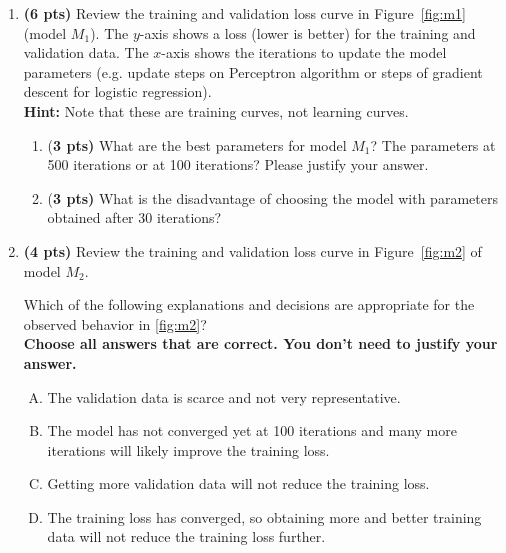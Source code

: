 \documentclass{article}
\begin{document}
\begin{enumerate}[1.]
\item \textbf{(6 pts)} Review the training and validation loss curve in Figure~\ref{fig:m1} (model $M_1$).
The $y$-axis shows a loss (lower is better) for the training and validation data.
The $x$-axis shows the iterations to update the model parameters (e.g. update steps on Perceptron algorithm or steps of gradient descent for logistic regression).\\
{\bf Hint:} Note that these are training curves, not learning curves.



\begin{enumerate}
\item {(\bf 3 pts)} What are the best parameters for model $M_1$? The parameters at 500 iterations or at 100 iterations? Please justify your answer.

\begin{tcolorbox}[breakable,
enhanced,
notitle,
width=14.5cm,
height=5cm]
%
%

\end{tcolorbox}


\item {(\bf 3 pts)} What is the disadvantage of choosing the model with parameters obtained after 30 iterations?


\begin{tcolorbox}[breakable,
enhanced,
notitle,
width=14.5cm,
height=5cm]
%
%

\end{tcolorbox}

\end{enumerate}

\newpage
\item \textbf{(4 pts)} Review the training and validation loss curve in Figure~\ref{fig:m2} of model $M_2$. 

Which of the following explanations and decisions are appropriate for the observed behavior in \ref{fig:m2}?\\
{\bf Choose all answers that are correct. You don't need to justify your answer.}
\begin{enumerate}[(A)]
    \item The validation data is scarce and not very representative.
    \item The model has not converged yet at 100 iterations and many more iterations will likely improve the training loss.
    \item Getting more validation data will not reduce the training loss.
    \item The training loss has converged, so obtaining more and better training data will not reduce the training loss further.
\end{enumerate}


\end{enumerate}
\end{document}
